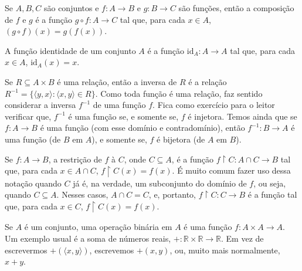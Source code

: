 Se $A, B, C$ são conjuntos e $f: A\to B$ e $g: B\to C$ são funções, então a composição de $f$ e $g$ é a função $g\circ f: A\to C$ tal que, para cada $x\in A$, $(g\circ f)(x)=g(f(x))$.

A função identidade de um conjunto $A$ é a função $\text{id}_A: A\to A$ tal que, para cada $x\in A$, $\text{id}_A(x)=x$.

Se $R\subseteq A\times B$ é uma relação, então a inversa de $R$ é a relação $R^{-1}=\{\langle y, x\rangle: \langle x, y\rangle \in R\}$.
Como toda função é uma relação, faz sentido considerar a inversa $f^{-1}$ de uma função $f$.
Fica como exercício para o leitor verificar que, $f^{-1}$ é uma função se, e somente se, $f$ é injetora.
Temos ainda que se $f: A\to B$ é uma função (com esse domínio e contradomínio), então $f^{-1}: B\to A$ é uma função (de $B$ em $A$), e somente se, $f$ é bijetora (de $A$ em $B$).

Se $f:A\rightarrow B$, a restrição de $f$ à $C$, onde $C\subseteq A$, é a função $f\restriction C: A\cap C\to B$ tal que, para cada $x\in A\cap C$, $f\restriction C(x)=f(x)$.
É muito comum fazer uso dessa notação quando $C$ já é, na verdade, um subconjunto do domínio de $f$, ou seja, quando $C\subseteq A$.
Nesses casos, $A\cap C=C$, e, portanto, $f\restriction C: C\to B$ é a função tal que, para cada $x\in C$, $f\restriction C(x)=f(x)$.

Se $A$ é um conjunto, uma operação binária em $A$ é uma função $f: A\times A\to A$.
Um exemplo usual é a soma de números reais, $+: \mathbb R\times \mathbb R\to \mathbb R$.
Em vez de escrevermos $+(\langle x, y\rangle)$, escrevemos $+(x, y)$, ou, muito mais normalmente, $x+y$.